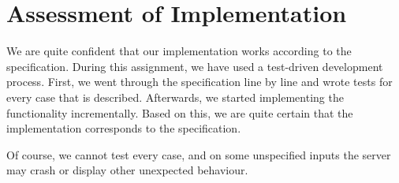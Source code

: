 \documentclass{article}
\begin{document}
	\section{Assessment of Implementation}
	We are quite confident that our implementation works according to the specification. During this assignment, we have used a test-driven development process. First, we went through the specification line by line and wrote tests for every case that is described. Afterwards, we started implementing the functionality incrementally. Based on this, we are quite certain that the implementation corresponds to the specification.
	
	Of course, we cannot test every case, and on some unspecified inputs the server may crash or display other unexpected behaviour. 
	
\end{document}
